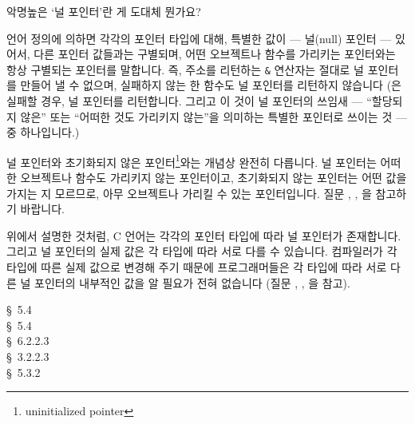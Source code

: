 \begin{faq}
	악명높은 `널 포인터'란 게 도대체 뭔가요?

\A
	언어 정의에 의하면 각각의 포인터 타입에 대해, 특별한 값이 --- 
	널(null) 포인터 --- 있어서, 다른 포인터 값들과는 구별되며, 어떤
	오브젝트나 함수를 가리키는 포인터와는 항상 구별되는 포인터를 말합니다.
	즉, 주소를 리턴하는 \verb+&+ 연산자는 절대로 널 포인터를 만들어 낼
	수 없으며, 실패하지 않는 한  함수도 널 포인터를
	리턴하지 않습니다 (은 실패할 경우, 널 포인터를
	리턴합니다.  그리고 이 것이 널 포인터의 쓰임새 --- ``할당되지 않은''
	또는 ``어떠한 것도 가리키지 않는''을 의미하는 특별한 포인터로
	쓰이는 것 --- 중 하나입니다.)

	널 포인터와 초기화되지 않은 포인터\footnote{uninitialized pointer}와는
	개념상 완전히 다릅니다.
	널 포인터는 어떠한 오브젝트나 함수도 가리키지 않는 포인터이고,
	초기화되지 않는 포인터는 어떤 값을 가지는 지 모르므로, 아무
	오브젝트나 가리킬 수 있는 포인터입니다.  질문 , , 을
	참고하기 바랍니다.

	위에서 설명한 것처럼, C 언어는 각각의 포인터 타입에 따라 널 포인터가
	존재합니다.  그리고 널 포인터의 실제 값은 각 타입에 따라
	서로 다를 수 있습니다.  컴파일러가 각 타입에 따른 실제 값으로
	변경해 주기 때문에 프로그래머들은 각 타입에 따라 서로
	다른 널 포인터의 내부적인 값을 알 필요가 전혀 없습니다
	(질문 , , 을 참고).

\R
	\cite{kr1} \S\ 5.4  \\
	\cite{kr2} \S\ 5.4  \\
	\cite{c89} \S\ 6.2.2.3 \\
	\cite{rationale} \S\ 3.2.2.3 \\
	\cite{hs} \S\ 5.3.2 
\end{faq}

